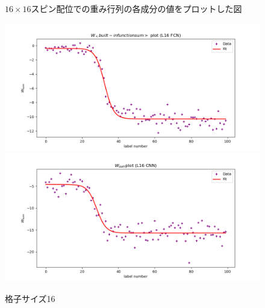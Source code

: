 \documentclass[a4paper,11pt]{jsreport}
\begin{document}
\begin{figure}[H]
\begin{minipage}[b]{0.45\linewidth}
\begin{center}
    \end{center}
  \end{minipage}
  \caption{$16 \times 16$スピン配位での重み行列の各成分の値をプロットした図}
  \label{温度測定器ヒートマップ16}
\end{figure}

\begin{figure}[H]
  \begin{center}
    \includegraphics[width=\linewidth]{image/L16_FCNN_weight_sum.png}
    \includegraphics[width=\linewidth]{image/L16_CNN_weight_sum.png}
  \end{center}
  \caption{格子サイズ16}
  \label{温度測定器プロット16}
\end{figure}
\end{document}
